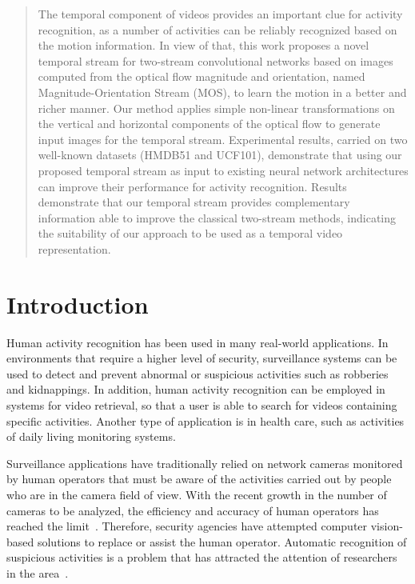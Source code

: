 \documentclass[10pt,conference]{IEEEtran}
\begin{document}
%
\begin{abstract}
	The temporal component of videos provides an important clue for activity recognition, as a number of activities can be reliably recognized based on the motion information. In view of that, this work proposes a novel temporal stream for two-stream convolutional networks based on images computed from the optical flow magnitude and orientation, named Magnitude-Orientation Stream (MOS), to learn the motion in a better and richer manner. Our method applies simple non-linear transformations on the vertical and horizontal components of the optical flow to generate input images for the temporal stream. %
	Experimental results, carried on two well-known datasets (HMDB51 and UCF101), demonstrate that using our proposed temporal stream as input to existing neural network architectures can improve their performance for activity recognition.
	Results demonstrate that our temporal stream provides complementary information able to improve the classical two-stream methods, indicating the suitability of our approach to be used as a temporal video representation.
\end{abstract}

\IEEEpeerreviewmaketitle

%
\section{Introduction}\label{introduction}

Human activity recognition has been used in many real-world applications. In environments that require a higher level of security, surveillance systems can be used to detect and prevent abnormal or suspicious activities such as robberies and kidnappings. In addition, human activity recognition can be employed in systems for video retrieval, so that a user is able to search for videos containing specific activities. Another type of application is in health care, such as activities of daily living  monitoring systems.

Surveillance applications have traditionally relied on network cameras monitored by human operators that must be aware of the activities carried out by people who are in the camera field of view. With the recent growth in the number of cameras to be analyzed, the efficiency and accuracy of human operators has reached the limit~\cite{Keval:2006}. Therefore, security agencies have attempted computer vision-based solutions to replace or assist the human operator. Automatic recognition of suspicious activities is a problem that has attracted the attention of researchers in the area~\cite{Danafar:2007, Reddy:2011, Wiliem:2012, WangAndXu:2016}.
\end{document}
